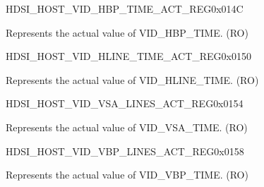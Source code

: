 \begin{register}{H}{DSI\_HOST\_VID\_HBP\_TIME\_ACT\_REG}{0x014C}\label{regdesc:DSIHOSTVIDHBPTIMEACTREG}
%
%
\regnewline%
\begin{regdesc}\begin{reglist}
\label{fielddesc:DSIHOSTVIDHBPTIMEACT}\item [DSI\_HOST\_VID\_HBP\_TIME\_ACT] Represents the actual value of VID\_HBP\_TIME. (RO)
\end{reglist}\end{regdesc}
\end{register}


\begin{register}{H}{DSI\_HOST\_VID\_HLINE\_TIME\_ACT\_REG}{0x0150}\label{regdesc:DSIHOSTVIDHLINETIMEACTREG}
%
%
\regnewline%
\begin{regdesc}\begin{reglist}
\label{fielddesc:DSIHOSTVIDHLINETIMEACT}\item [DSI\_HOST\_VID\_HLINE\_TIME\_ACT] Represents the actual value of VID\_HLINE\_TIME. (RO)
\end{reglist}\end{regdesc}
\end{register}


\begin{register}{H}{DSI\_HOST\_VID\_VSA\_LINES\_ACT\_REG}{0x0154}\label{regdesc:DSIHOSTVIDVSALINESACTREG}
%
%
\regnewline%
\begin{regdesc}\begin{reglist}
\label{fielddesc:DSIHOSTVSALINESACT}\item [DSI\_HOST\_VSA\_LINES\_ACT] Represents the actual value of VID\_VSA\_TIME. (RO)
\end{reglist}\end{regdesc}
\end{register}


\begin{register}{H}{DSI\_HOST\_VID\_VBP\_LINES\_ACT\_REG}{0x0158}\label{regdesc:DSIHOSTVIDVBPLINESACTREG}
%
%
\regnewline%
\begin{regdesc}\begin{reglist}
\label{fielddesc:DSIHOSTVBPLINESACT}\item [DSI\_HOST\_VBP\_LINES\_ACT] Represents the actual value of VID\_VBP\_TIME. (RO)
\end{reglist}\end{regdesc}
\end{register}


